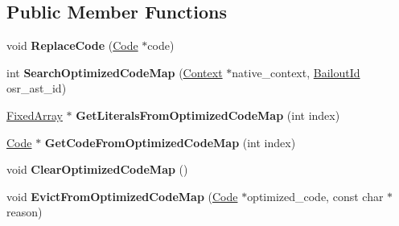 \subsection*{Public Member Functions}
\begin{DoxyCompactItemize}
\item 
\hypertarget{classv8_1_1internal_1_1_shared_function_info_aabebd159b454298b0c39320cf24c13ff}{}void {\bfseries Replace\+Code} (\hyperlink{classv8_1_1internal_1_1_code}{Code} $\ast$code)\label{classv8_1_1internal_1_1_shared_function_info_aabebd159b454298b0c39320cf24c13ff}

\item 
\hypertarget{classv8_1_1internal_1_1_shared_function_info_acc2a78cea7252a1758624bbe640b8f3d}{}int {\bfseries Search\+Optimized\+Code\+Map} (\hyperlink{classv8_1_1internal_1_1_context}{Context} $\ast$native\+\_\+context, \hyperlink{classv8_1_1internal_1_1_bailout_id}{Bailout\+Id} osr\+\_\+ast\+\_\+id)\label{classv8_1_1internal_1_1_shared_function_info_acc2a78cea7252a1758624bbe640b8f3d}

\item 
\hypertarget{classv8_1_1internal_1_1_shared_function_info_aee75dd0456f4534eb95860f4f787e77f}{}\hyperlink{classv8_1_1internal_1_1_fixed_array}{Fixed\+Array} $\ast$ {\bfseries Get\+Literals\+From\+Optimized\+Code\+Map} (int index)\label{classv8_1_1internal_1_1_shared_function_info_aee75dd0456f4534eb95860f4f787e77f}

\item 
\hypertarget{classv8_1_1internal_1_1_shared_function_info_ac13b2918ac41171291684fcab75f692b}{}\hyperlink{classv8_1_1internal_1_1_code}{Code} $\ast$ {\bfseries Get\+Code\+From\+Optimized\+Code\+Map} (int index)\label{classv8_1_1internal_1_1_shared_function_info_ac13b2918ac41171291684fcab75f692b}

\item 
\hypertarget{classv8_1_1internal_1_1_shared_function_info_ad5fadaa94b7cf7af93630aeca427ba35}{}void {\bfseries Clear\+Optimized\+Code\+Map} ()\label{classv8_1_1internal_1_1_shared_function_info_ad5fadaa94b7cf7af93630aeca427ba35}

\item 
\hypertarget{classv8_1_1internal_1_1_shared_function_info_ad6732306115e604cfbec5714cb6ec334}{}void {\bfseries Evict\+From\+Optimized\+Code\+Map} (\hyperlink{classv8_1_1internal_1_1_code}{Code} $\ast$optimized\+\_\+code, const char $\ast$reason)\label{classv8_1_1internal_1_1_shared_function_info_ad6732306115e604cfbec5714cb6ec334}


\end{DoxyCompactItemize}
